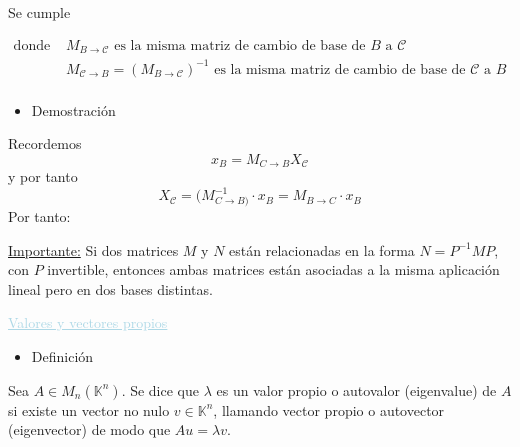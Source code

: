 \documentclass[12pt]{article}
\begin{document}
Se cumple \begin{center}
\end{center} 
$\begin{array}{ll}
\text{donde }& M_{B\rightarrow\mathcal{C}} \text{ es la misma matriz de cambio de base de }B \text{ a } \mathcal{C}\\
& M_{\mathcal{C}\rightarrow B}=(M_{B\rightarrow\mathcal{C}})^{-1} \text{ es la misma matriz de cambio de base de }\mathcal{C} \text{ a } B\\
\end{array}$
\begin{itemize}[label=\color{red}\textbullet, leftmargin=*]
    \item \color{lightblue}Demostración
\end{itemize}
Recordemos \[x_B=M_{C\rightarrow B}X_{\mathcal{C}}\] y por tanto \[X_{\mathcal{C}}=(M_{C\rightarrow B)}^{-1}\cdot x_B=M_{B\rightarrow C}\cdot x_B\]
Por tanto: 
\begin{center}
\end{center}
\underline{Importante:} Si dos matrices $M$ y $N$ están relacionadas en la forma $N=P^{-1}MP$, con $P$ invertible, entonces ambas matrices están asociadas a la misma aplicación lineal pero en dos bases distintas.

\textcolor{lightblue}{\underline{Valores y vectores propios}}

\begin{itemize}[label=\color{red}\textbullet, leftmargin=*]
    \item \color{lightblue} Definición
\end{itemize}
Sea $A\in M_n(\mathbb{K}^n)$. Se dice que $\lambda$ es un valor propio o autovalor (eigenvalue) de $A$ si existe un vector no nulo $v\in \mathbb{K}^n$, llamando vector propio o autovector (eigenvector) de modo que $Au=\lambda v$.
\end{document}

